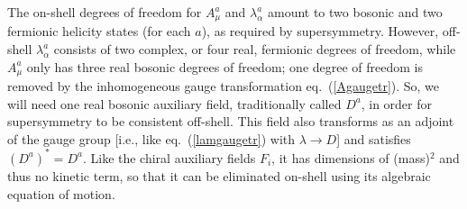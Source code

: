 The on-shell degrees of freedom for $A^a_\mu$ and $\lambda^a_\alpha$
amount
to
two bosonic and two fermionic helicity states (for each $a$), as required
by supersymmetry. However, off-shell $\lambda^a_\alpha$ consists of
two complex, or four real, fermionic degrees of freedom, while
$A^a_\mu$ only has three real bosonic degrees of freedom; one degree of
freedom
is removed by the inhomogeneous gauge transformation eq.~(\ref{Agaugetr}).
So, we will need one real bosonic auxiliary field,
traditionally called $D^a$, in order for supersymmetry to be consistent
off-shell. This field also transforms as an adjoint of the gauge group
[i.e., like eq.~(\ref{lamgaugetr}) with $\lambda \rightarrow D$]
and satisfies $(D^a)^* = D^a$.
Like the chiral auxiliary fields $F_i$, it has dimensions of (mass)$^2$
and thus no kinetic term, so that it can be eliminated on-shell using its
algebraic equation of motion.

